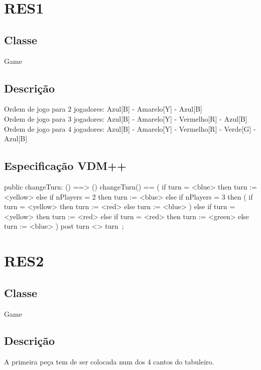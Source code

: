 \section{RES1}
\subsection{Classe}
Game
\subsection{Descrição}
Ordem de jogo para 2 jogadores: Azul[B] - Amarelo[Y] - Azul[B]
\\Ordem de jogo para 3 jogadores: Azul[B] - Amarelo[Y] - Vermelho[R] - Azul[B]
\\Ordem de jogo para 4 jogadores: Azul[B] - Amarelo[Y] - Vermelho[R] - Verde[G] - Azul[B]
\subsection{Especificação VDM++}
\begin{vdm_al}
public changeTurn: () ==> () 
  changeTurn() == ( 
      if turn = <blue> then 
        turn := <yellow> 
      else if nPlayers = 2 then 
          turn := <blue> 
        else if nPlayers = 3 then ( 
          if turn = <yellow> then 
            turn := <red> 
        else 
          turn := <blue> 
          ) 
      else if turn = <yellow> then 
        turn := <red> 
      else if turn = <red> then 
        turn := <green> 
    else 
      turn := <blue>                
  ) 
  post turn <> turn~;
\end{vdm_al}

\section{RES2}
\subsection{Classe}
Game
\subsection{Descrição}
A primeira peça tem de ser colocada num dos 4 cantos do tabuleiro.
